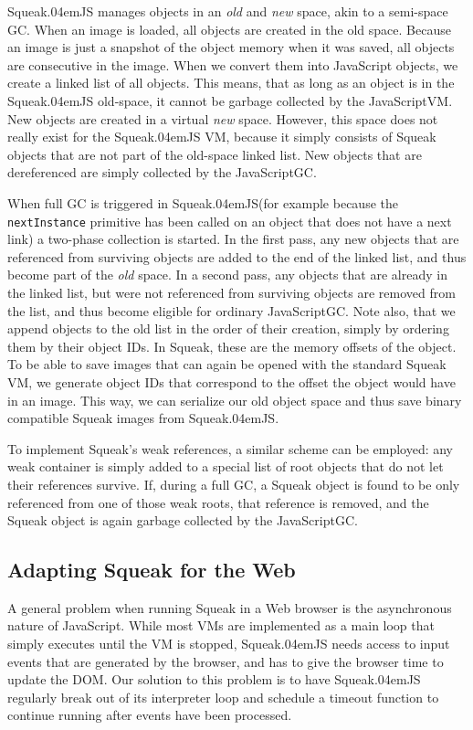 \documentclass[natbib]{sigplanconf}
\newcommand*\SqueakJS{Squeak\texorpdfstring{\kern.04em}{}JS\xspace}
\newcommand*\JS{JavaScript\xspace}
\begin{document}
\SqueakJS manages objects in an \emph{old} and \emph{new} space, akin
to a semi-space \ac{GC}. When an image is loaded, all objects are
created in the old space. Because an image is just a snapshot of the
object memory when it was saved, all objects are consecutive in the
image. When we convert them into \JS objects, we create a
linked list of all objects. This means, that as long as an object is
in the \SqueakJS old-space, it cannot be garbage collected by the
\JS \ac{VM}. New objects are created in a virtual \emph{new}
space. However, this space does not really exist for the \SqueakJS
\ac{VM}, because it simply consists of Squeak objects that are not
part of the old-space linked list. New objects that are dereferenced
are simply collected by the \JS \ac{GC}.

When full \ac{GC} is triggered in \SqueakJS (for example because the
\lstinline{nextInstance} primitive has been called on an object that
does not have a next link) a two-phase collection is started. In the
first pass, any new objects that are referenced from surviving objects
are added to the end of the linked list, and thus become part of the
\emph{old} space. In a second pass, any objects that are already in
the linked list, but were not referenced from surviving objects are
removed from the list, and thus become eligible for ordinary
\JS \ac{GC}. Note also, that we append objects to the old list
in the order of their creation, simply by ordering them by their
object \acp{ID}. In Squeak, these are the memory offsets of the object. To
be able to save images that can again be opened with the standard
Squeak \ac{VM}, we generate object \acp{ID} that correspond to the offset
the object would have in an image. This way, we can serialize our old
object space and thus save binary compatible Squeak images from
\SqueakJS.

To implement Squeak's weak references, a similar scheme can be
employed: any weak container is simply added to a special list of root
objects that do not let their references survive. If, during a full
\ac{GC}, a Squeak object is found to be only referenced from one of
those weak roots, that reference is removed, and the Squeak object is
again garbage collected by the \JS \ac{GC}.

\subsection{Adapting Squeak for the Web}
\label{sec:adapting-for-web}

A general problem when running Squeak in a Web browser is the
asynchronous nature of \JS. While most \acp{VM} are implemented as a
main loop that simply executes until the \ac{VM} is stopped, \SqueakJS
needs access to input events that are generated by the browser, and
has to give the browser time to update the \ac{DOM}. Our solution to
this problem is to have \SqueakJS regularly break out of its
interpreter loop and schedule a timeout function to continue running
after events have been processed.
\end{document}
